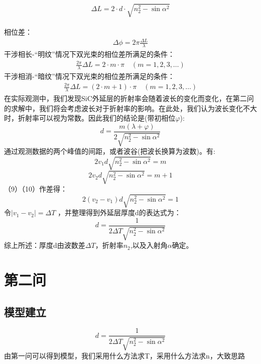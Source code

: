 \documentclass{cumcmthesis}
\begin{document}
$$\Delta L = 2\cdot d \cdot \sqrt{n_2^2 - \sin \alpha^2} $$  \\
相位差：
\begin{gather}
	\Delta \phi = 2\pi \frac{\Delta L}{\lambda}
\end{gather}
干涉相长-“明纹”情况下双光束的相位差所满足的条件：
\begin{gather}
	\frac{2\pi}{\lambda}\Delta L = 2\cdot m\cdot \pi  \quad (m=1,2,3,\ldots)
\end{gather}
干涉相消-“暗纹”情况下双光束的相位差所满足的条件：
\begin{gather}
	\frac{2\pi}{\lambda}\Delta L = (2\cdot m + 1 )\cdot \pi \quad (m=1,2,3,\ldots)
\end{gather}
在实际观测中，我们发现SiC外延层的折射率会随着波长的变化而变化，在第二问的求解中，我们将会考虑波长对于折射率的影响。在此处，我们认为波长变化不大时，折射率可以视为常数。因此我们的结论是(带初相位$\varphi$):
\begin{equation}
	d = \frac{m (\lambda + \varphi)  }{2\sqrt{n_2^2 - \sin \alpha^2}}
\end{equation}
通过观测数据的两个峰值的间距，或者波谷(把波长换算为波数)。有:
\begin{equation}
2v_1d\sqrt{n_2^2 - \sin \alpha^2} = m
\end{equation}
\begin{equation}
2v_2d\sqrt{n_2^2 - \sin \alpha^2} = m+1
\end{equation}
（9）（10）作差得：
\begin{equation}
2(v_2-v_1)d\sqrt{n_2^2 - \sin \alpha^2} = 1
\end{equation}
令$
|v_1 - v_2| = \Delta T
$
，并整理得到外延层厚度d的表达式为：\begin{equation}
d = \frac{1}{2 \Delta T \sqrt{n_2^2 - \sin \alpha^2}}
\end{equation}
综上所述：厚度d由波数差$\Delta T$，折射率$n_2$,以及入射角$\alpha$确定。
	 
	\section{第二问}
	\subsection{模型建立}
	\begin{equation}
	d = \frac{1}{2 \Delta T \sqrt{n_2^2 - \sin \alpha^2}}
	\end{equation}
	由第一问可以得到模型，我们采用什么方法求T，采用什么方法求n，大致思路
\end{document}
